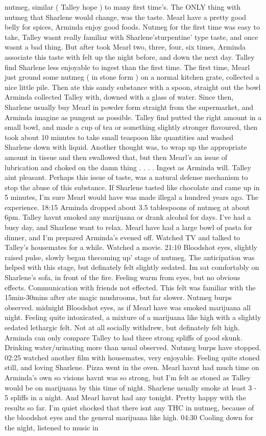 \documentclass[12pt]{book}
\begin{document}
nutmeg, similar ( Talley hope ) to many first time's. The ONLY thing with nutmeg that Sharlene would change, was the taste. Mearl have a pretty good belly for spices, Arminda enjoy good foods. Nutmeg for the first time was easy to take, Talley wasnt really familiar with Sharlene'sturpentine' type taste, and once wasnt a bad thing. But after took Mearl two, three, four, six times, Arminda associate this taste with felt up the night before, and down the next day. Talley find Sharlene less enjoyable to ingest than the first time. The first time, Mearl just ground some nutmeg ( in stone form ) on a normal kitchen grate, collected a nice little pile. Then ate this sandy substance with a spoon, straight out the bowl Arminda collected Talley with, downed with a glass of water. Since then, Sharlene usually buy Mearl in powder form straight from the supermarket, and Arminda imagine as pungent as possible. Talley find putted the right amount in a small bowl, and made a cup of tea or something slightly stronger flavoured, then took about 10 minutes to take small teaspoon like quantities and washed Sharlene down with liquid. Another thought was, to wrap up the appropriate amount in tissue and then swallowed that, but then Mearl's an issue of lubrication and choked on the damn thing . . .  . Ingest as Arminda will. Talley aint pleasant. Perhaps this issue of taste, was a natural defense mechanism to stop the abuse of this substance. If Sharlene tasted like chocolate and came up in 5 minutes, I'm sure Mearl would have was made illegal a hundred years ago. The experience. 18:15 Arminda dropped about 3.5 tablespoons of nutmeg at about 6pm. Talley havnt smoked any marijuana or drank alcohol for days. I've had a busy day, and Sharlene want to relax. Mearl have had a large bowl of pasta for dinner, and I'm prepared Arminda's evened off. Watched TV and talked to Talley's housemates for a while. Watched a movie. 21:10 Bloodshot eyes, slightly raised pulse, slowly began thecoming up' stage of nutmeg. The anticipation was helped with this stage, but definately felt slightly sedated. Im sat comfortably on Sharlene's sofa, in front of the fire. Feeling warm from eyes, but no obvious effects. Communication with friends not effected. This felt was familiar with the 15min-30mins after ate magic mushrooms, but far slower. Nutmeg burps observed. midnight Bloodshot eyes, as if Mearl have was smoked marijuana all night. Feeling quite intoxicated, a mixture of a marijuana like high with a slightly sedated lethargic felt. Not at all socially withdrew, but definately felt high. Arminda can only compare Talley to had three strong spliffs of good skunk. Drinking water/urinating more than usual observed. Nutmeg burps have stopped. 02:25 watched another film with housemates, very enjoyable. Feeling quite stoned still, and loving Sharlene. Pizza went in the oven. Mearl havnt had much time on Arminda's own so visions havnt was so strong, but I'm felt as stoned as Talley would be on marijuana by this time of night. Sharlene usually smoke at least 3 - 5 spliffs in a night. And Mearl havnt had any tonight. Pretty happy with the results so far. I'm quiet shocked that there isnt any THC in nutmeg, because of the bloodshot eyes and the general marijuana like high. 04:30 Cooling down for the night, listened to music in 
\end{document}

